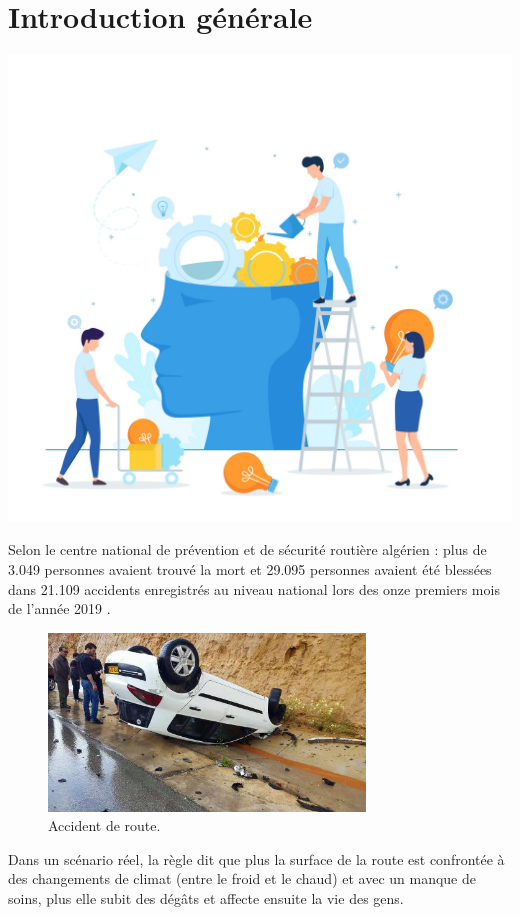 \chapter*{Introduction générale}
\renewcommand{\thesection}{\arabic{section}}
		



\label{chapitre1}
		
		\includegraphics [width=1 \linewidth, height=0.8\textheight, keepaspectratio] {Images/chapterFigures/chOne.png}
		
	
		
    \newpage
    \thispagestyle{plain}
Selon le centre national de prévention et de sécurité routière algérien :
plus de 3.049 personnes avaient trouvé la mort et 29.095 personnes avaient été blessées
dans 21.109 accidents enregistrés au niveau national lors des onze premiers mois de l'année 2019  \cite{nassimaAccidentsRouteAlger}.
\begin{figure}[h!]
  \center
  \includegraphics[width=0.75\textwidth]{Images/chapter1/accident.jpg}
  \caption{Accident de route.}
  \label{fig:Accident}
\end{figure}
Dans un scénario réel, la règle dit que plus la surface de la route est confrontée
à des changements de climat (entre le froid et le chaud) et avec un manque de soins,
plus elle subit des dégâts et affecte ensuite la vie des gens.

